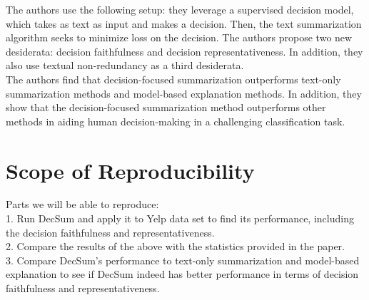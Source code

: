\documentclass{article}
\begin{document}
The authors use the following setup: they leverage a supervised decision model, which takes as text as input and makes a decision. Then, the text summarization algorithm seeks to minimize loss on the
decision. The authors propose two new desiderata: decision faithfulness and decision representativeness. In addition, they also use textual non-redundancy as a third desiderata. \\

The authors find that decision-focused summarization outperforms text-only summarization methods and model-based explanation methods. In addition, they show that the decision-focused summarization
method outperforms other methods in aiding human decision-making in a challenging classification task.

\section{Scope of Reproducibility}
Parts we will be able to reproduce: \\
1.  Run DecSum and apply it to Yelp data set to find its performance, including the decision faithfulness and representativeness. \\
2. Compare the results of the above with the statistics provided in the paper. \\
3. Compare DecSum’s performance to text-only summarization and model-based explanation to see if DecSum indeed has better performance in terms of decision faithfulness and representativeness. \\
\end{document}
